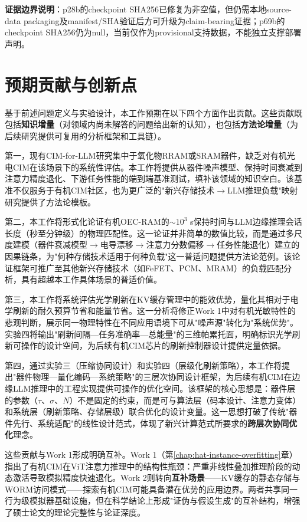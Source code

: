 \textbf{证据边界说明}：p28b的checkpoint SHA256已修复为非空值，但仍需本地source-data packaging及manifest/SHA验证后方可升级为claim-bearing证据；p69b的checkpoint SHA256仍为null，当前仅作为provisional支持数据，不能独立支撑部署声明。


\section{预期贡献与创新点}
\label{sec:work2_contributions}

基于前述问题定义与实验设计，本工作预期在以下四个方面作出贡献。这些贡献既包括\textbf{知识增量}（对领域内尚未解答的问题给出新的认知），也包括\textbf{方法论增量}（为后续研究提供可复用的分析框架和工具链）。

第一，现有CIM-for-LLM研究集中于氧化物RRAM或SRAM器件，缺乏对有机光电CIM在该场景下的系统性评估。本工作将提供从器件噪声模型、保持时间衰减到注意力精度退化、下游任务性能的端到端基准测试，填补该领域的知识空白。该基准不仅服务于有机CIM社区，也为更广泛的"新兴存储技术$\rightarrow$LLM推理负载"映射研究提供了方法论模板。

第二，本工作将形式化论证有机OEC-RAM的$\sim$$10^3$ s保持时间与LLM边缘推理会话长度（秒至分钟级）的物理匹配性。这一论证并非简单的数值比较，而是通过多尺度建模（器件衰减模型$\rightarrow$电导漂移$\rightarrow$注意力分数偏移$\rightarrow$任务性能退化）建立的因果链条，为"何种存储技术适用于何种负载"这一普适问题提供方法论范例。该论证框架可推广至其他新兴存储技术（如FeFET、PCM、MRAM）的负载匹配分析，具有超越本工作具体场景的普适价值。

第三，本工作将系统评估光学刷新在KV缓存管理中的能效优势，量化其相对于电学刷新的耐久预算节省和能量节省。这一分析将修正Work 1中对有机光敏特性的悲观判断，展示同一物理特性在不同应用语境下可从"噪声源"转化为"系统优势"。实验四将输出"刷新间隔—任务准确率—总能量"的三维帕累托面，明确标识光学刷新可操作的设计空间，为后续有机CIM芯片的刷新控制器设计提供定量依据。

第四，通过实验三（压缩协同设计）和实验四（层级化刷新策略），本工作将提出"器件物理—量化编码—系统策略"的三层次协同设计框架，为后续有机CIM在边缘LLM推理中的工程实现提供可操作的优化空间。该框架的核心思想是：器件层的参数（$\tau$、$\sigma$、$N$）不是固定的约束，而是可与算法层（码本设计、注意力变体）和系统层（刷新策略、存储层级）联合优化的设计变量。这一思想打破了传统"器件先行、系统适配"的线性设计范式，体现了新兴计算范式所要求的\textbf{跨层次协同优化}理念。

这些贡献与Work 1形成明确互补。Work 1（第\ref{chap:hat-instance-overfitting}章）指出了有机CIM在ViT注意力推理中的结构性瓶颈：严重非线性叠加推理阶段的动态激活导致模拟精度快速退化。Work 2则转向\textbf{互补场景}——KV缓存的静态存储与WORM访问模式——探索有机CIM可能具备潜在优势的应用边界。两者共享同一行为级模拟器基础设施，但在科学结论上形成"证伪与假设生成"的互补结构，增强了硕士论文的理论完整性与论证深度。

